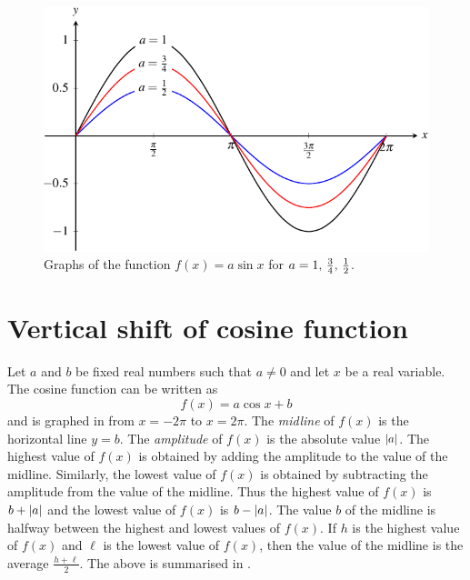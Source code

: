 \documentclass[a4paper,oneside,12pt]{article}
\begin{document}
{\begin{solution}
\begin{figure}[!htbp]
\centering
\includegraphics[scale=1.1]{image/13/sin-vertical-compress.pdf}
\caption{%
  Graphs of the function $f(x) = a \sin x$ for
  $a = {1},\, {\frac{3}{4}},\, {\frac{1}{2}}$.
}
\label{fig:trigonometric:sine_vertical_compress}
\end{figure}

\end{solution}
}{}



\section{Vertical shift of cosine function}

Let $a$ and $b$ be fixed real numbers such that $a \neq 0$ and let $x$
be a real variable.  The cosine function can be written as
\[
f(x)
=
a \cos x + b
\]
and is graphed in  from $x = -2\pi$
to $x = 2\pi$.  The \emph{midline} of $f(x)$ is the horizontal line
$y = b$.  The \emph{amplitude} of $f(x)$ is the absolute value
$\lvert a\rvert$.  The highest value of $f(x)$ is obtained by
adding the amplitude to the value of the midline.  Similarly, the
lowest value of $f(x)$ is obtained by subtracting the amplitude from
the value of the midline. Thus the highest value of $f(x)$ is
$b + \lvert a\rvert$ and the lowest value of $f(x)$ is
$b - \lvert a\rvert$.  The value $b$ of the midline is halfway
between the highest and lowest values of $f(x)$.  If $h$ is the
highest value of $f(x)$ and $\ell$ is the lowest value of $f(x)$, then
the value of the midline is the average $\frac{h + \ell}{2}$.  The
above is summarised in
.
\end{document}
